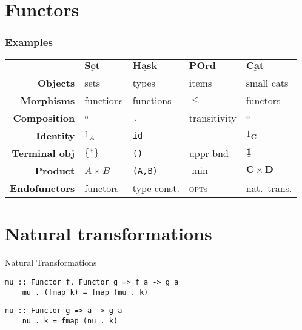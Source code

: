 \documentclass[10pt]{beamer}
\newcommand{\Cat}[1]{\ensuremath{\underline{\mathbf{#1}}}}
\theoremstyle{definition}
\theoremstyle{remark}
\numberwithin{equation}{section}
\begin{document}
\section{Functors}

\begin{frame}[fragile]
  \frametitle{Examples}
  \begin{tabular}{r l l l l}\toprule
    & $\Cat{Set}$ & $\Cat{Hask}$ & $\Cat{POrd}$ & $\Cat{Cat}$ \\\midrule
    \textbf{Objects} & sets & types & items & small cats \\
    \textbf{Morphisms} & functions & functions & $\leq$ & functors \\
    \textbf{Composition} & $\circ$ & \texttt{.} & transitivity & $\circ$ \\
    \textbf{Identity} & $1_A$ & \texttt{id} & $=$ & $1_{\Cat{C}}$ \\
    \textbf{Terminal obj\rlap{.}} & $\{*\}$ & \texttt{()} & uppr bnd & $\Cat{1}$ \\
    \textbf{Product} & $A \times B$ & \texttt{(A,B)} & $\min$ & $\Cat{C} \times \Cat{D}$ \\
    \textbf{Endofunctors} & functors & type const. & \textsc{opt}s & nat.\ trans.\\\bottomrule
  \end{tabular}
\end{frame}

\section{Natural transformations}

\begin{frame}[fragile]{Natural Transformations}

  \begin{lstlisting}[frame=single]
    mu :: Functor f, Functor g => f a -> g a
    mu . (fmap k) = fmap (mu . k)
  \end{lstlisting}
  
  \begin{lstlisting}[frame=single]
    nu :: Functor g => a -> g a
    nu . k = fmap (nu . k)
  \end{lstlisting}
  
\end{frame}
\end{document}
